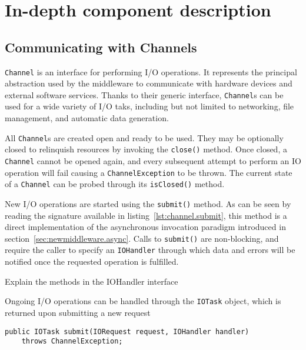 \chapter{In-depth component description}

\section{Communicating with Channels}

\texttt{Channel} is an interface for performing I/O operations. It represents the principal abstraction used by the middleware to communicate with hardware devices and external software services. Thanks to their generic interface, \texttt{Channel}s can be used for a wide variety of I/O taks, including but not limited to networking, file management, and automatic data generation.

All \texttt{Channel}s are created open and ready to be used. They may be optionally closed to relinquish resources by invoking the \texttt{close()} method. Once closed, a \texttt{Channel} cannot be opened again, and every subsequent attempt to perform an IO operation will fail causing a \texttt{ChannelException} to be thrown. The current state of a \texttt{Channel} can be probed through its \texttt{isClosed()} method.

New I/O operations are started using the \texttt{submit()} method. As can be seen by reading the signature available in listing~\ref{lst:channel.submit}, this method is a direct implementation of the asynchronous invocation paradigm introduced in section~\ref{sec:newmiddleware.async}. Calls to \texttt{submit()} are non-blocking, and require the caller to specify an \texttt{IOHandler} through which data and errors will be notified once the requested operation is fulfilled. 

Explain the methods in the IOHandler interface


Ongoing I/O operations can be handled through the \texttt{IOTask} object, which is returned upon submitting a new request

\lstset{language=Java}
\begin{lstlisting}[float,floatplacement=H,caption=The Channel.submit() method signature,label={lst:channel.submit}]
public IOTask submit(IORequest request, IOHandler handler)
	throws ChannelException;
\end{lstlisting}






